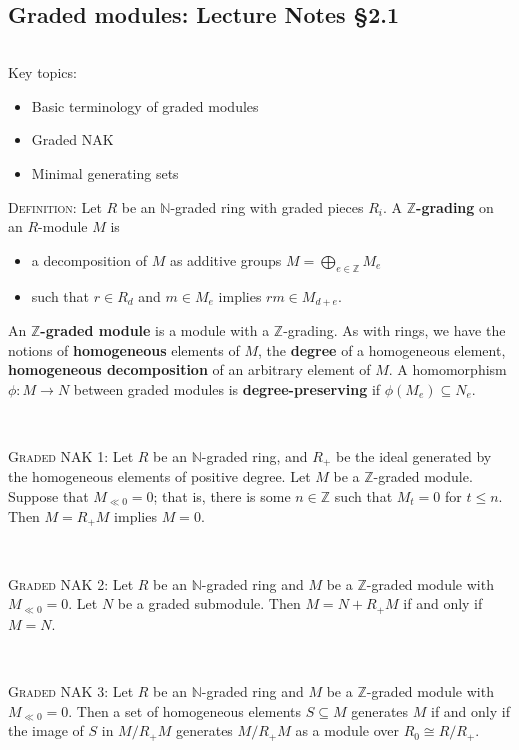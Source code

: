 \documentclass[12pt]{amsart}
\newcommand{\N}{\mathbb{N}}
\newcommand{\Z}{\mathbb{Z}}
\newcommand{\0}{$\phantom{.}$}
\newcommand{\1}{\mathbbm{1}}
\begin{document}
\newpage
\subsection{Graded modules: Lecture Notes \S2.1} \0

\begin{framed} Key topics:
\begin{itemize}
\item Basic terminology of graded modules
\item Graded NAK
\item Minimal generating sets
\end{itemize}
\end{framed}


\noindent \textsc{Definition:} Let $R$ be an $\N$-graded ring with graded pieces $R_i$. A \textbf{$\Z$-grading} on an $R$-module $M$ is
\begin{itemize}
\item a decomposition of $M$ as additive groups $M= \bigoplus_{e\in \Z} M_e$
\item such that $r\in R_d$ and $m\in M_e$ implies $rm\in M_{d+e}$. 
\end{itemize}
An \textbf{$\Z$-graded module} is a module with a $\Z$-grading. As with rings, we have the notions of \textbf{homogeneous} elements of $M$, the \textbf{degree} of a homogeneous element, \textbf{homogeneous decomposition} of an arbitrary element of $M$. A homomorphism $\phi:M\to N$ between graded modules is \textbf{degree-preserving} if $\phi(M_e) \subseteq N_e$.

\


\noindent \textsc{Graded NAK 1:} Let $R$ be an $\N$-graded ring, and $R_+$ be the ideal generated by the homogeneous elements of positive degree. Let $M$ be a $\Z$-graded module. Suppose that $M_{\ll 0}=0$; that is, there is some $n\in \Z$ such that $M_t=0$ for $t\leq n$. Then $M= R_+ M$ implies $M=0$.

\

\noindent \textsc{Graded NAK 2:} Let $R$ be an $\N$-graded ring and $M$ be a $\Z$-graded module with  $M_{\ll 0}=0$. Let $N$ be a graded submodule. Then $M=N+R_+ M$ if and only if $M=N$.


\

\noindent \textsc{Graded NAK 3:} Let $R$ be an $\N$-graded ring and $M$ be a $\Z$-graded module with $M_{\ll 0}=0$. Then a set of homogeneous elements $S\subseteq M$ generates $M$ if and only if the image of $S$ in $M/R_+ M$ generates  $M/R_+M$ as a module over $R_0 \cong R/R_+$.
\end{document}
